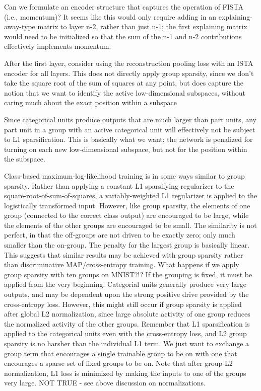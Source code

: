 Can we formulate an encoder structure that captures the operation of FISTA (i.e., momentum)?  It seems like this would only require adding in an explaining-away-type matrix to layer n-2, rather than just n-1; the first explaining matrix would need to be initialized so that the sum of the n-1 and n-2 contributions effectively implements momentum. 

After the first layer, consider using the reconstruction pooling loss with an ISTA encoder for all layers.  This does not directly apply group sparsity, since we don't take the square root of the sum of squares at any point, but does capture the notion that we want to identify the active low-dimensional subspaces, without caring much about the exact position within a subspace

Since categorical units produce outputs that are much larger than part units, any part unit in a group with an active categorical unit will effectively not be subject to L1 sparsification.  This is basically what we want; the network is penalized for turning on each new low-dimensional subspace, but not for the position within the subspace.  

Class-based maximum-log-likelihood training is in some ways similar to group sparsity.  Rather than applying a constant L1 sparsifying regularizer to the square-root-of-sum-of-squares, a variably-weighted L1 regularizer is applied to the logistically transformed input.  However, like group sparsity, the elements of one group (connected to the correct class output) are encouraged to be large, while the elements of the other groups are encouraged to be small.  The similarity is not perfect, in that the off-groups are not driven to be exactly zero; only much smaller than the on-group.  The penalty for the largest group is basically linear.  This suggests that similar results may be achieved with group sparsity rather than discriminative MAP/cross-entropy training.  What happens if we apply group sparsity with ten groups on MNIST?!?  If the grouping is fixed, it must be applied from the very beginning.  Categorial units generally produce very large outputs, and may be dependent upon the strong positive drive provided by the cross-entropy loss.  However, this might still occur if group sparsity is applied after global L2 normalization, since large absolute activity of one group reduces the normalized activity of the other groups.  Remember that L1 sparsification is applied to the categorical units even with the cross-entropy loss, and L2 group sparsity is no harsher than the individual L1 term.  We just want to exchange a group term that encourages a single trainable group to be on with one that encourages a sparse set of fixed groups to be on.  Note that after group-L2 normalization, L1 loss is minimized by making the inputs to one of the groups very large.  NOT TRUE - see above discussion on normalizations.


